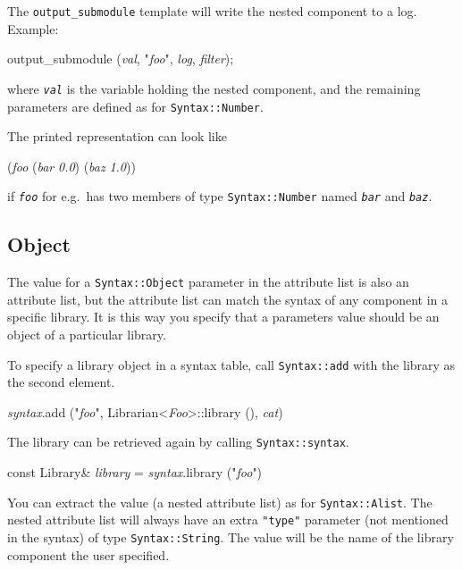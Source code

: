 \documentclass{article}
\newcommand{\code}[1]{\texttt{#1}}
\begin{document}
The \code{output\_submodule} template will write the nested component
to a log.  Example:
\begin{center}
  \begin{tt}
    output\_submodule (\textit{val}, "\textit{foo}", 
                       \textit{log}, \textit{filter});
  \end{tt}
\end{center}
where \texttt{\textit{val}} is the variable holding the nested
component, and the remaining parameters are defined as for
\texttt{Syntax::Number}. 

The printed representation can look like
\begin{center}
  \begin{tt}
    (\textit{foo} (\textit{bar} \textit{0.0}) (\textit{baz} \textit{1.0}))
  \end{tt}
\end{center}
if \texttt{\textit{foo}} for e.g.\ has two members of type
\code{Syntax::Number} named \texttt{\textit{bar}} and
\texttt{\textit{baz}}. 

\subsection{Object}

The value for a \code{Syntax::Object} parameter in the attribute list
is also an attribute list, but the attribute list can match the syntax
of any component in a specific library.  It is this way you specify
that a parameters value should be an object of a particular library.

To specify a library object in a syntax table, call
\code{Syntax::add} with the library as the second element.
\begin{center}
  \begin{tt}
    \textit{syntax}.add ("\textit{foo}", 
                         Librarian<\textit{Foo}>::library (),
                         \textit{cat})
  \end{tt}
\end{center}
The library can be retrieved again
by calling \code{Syntax::syntax}.
\begin{center}
  \begin{tt}
    const Library\& \textit{library}
      = \textit{syntax}.library ("\textit{foo}")
  \end{tt}
\end{center}

You can extract the value (a nested attribute list) as for
\code{Syntax::Alist}.  The nested attribute list will always have an
extra \code{"type"} parameter (not mentioned in the syntax) of type
\code{Syntax::String}.  The value will be the name of the library
component the user specified.
\end{document}

